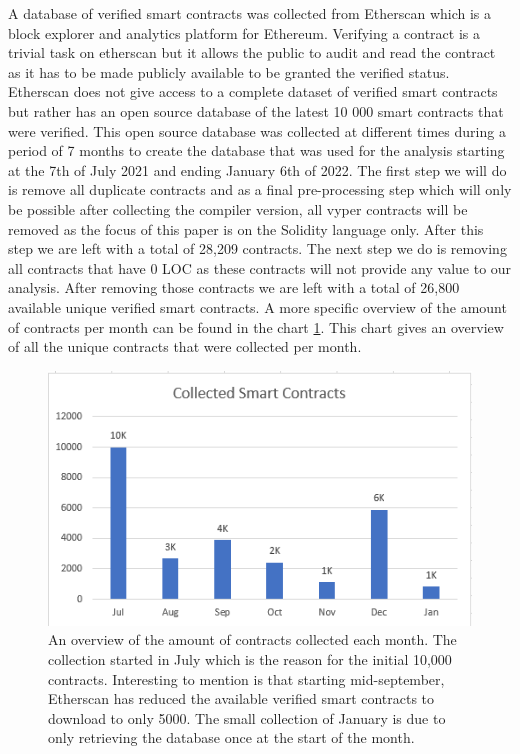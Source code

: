\documentclass[10pt,conference]{IEEEtran}
\begin{document}
A database of verified smart contracts was collected from Etherscan which is a block explorer and analytics platform for Ethereum. Verifying a contract is a trivial task on etherscan but it allows the public to audit and read the contract as it has to be made publicly available to be granted the verified status. Etherscan does not give access to a complete dataset of verified smart contracts but rather has an open source database of the latest 10 000 smart contracts that were verified. This open source database was collected at different times during a period of 7 months to create the database that was used for the analysis starting at the 7th of July 2021 and ending January 6th of 2022. The first step we will do is remove all duplicate contracts and as a final pre-processing step which will only be possible after collecting the compiler version, all vyper contracts will be removed as the focus of this paper is on the Solidity language only. After this step we are left with a total of 28,209 contracts. The next step we do is removing all contracts that have 0 LOC as these contracts will not provide any value to our analysis. After removing those contracts we are left with a total of 26,800 available unique verified smart contracts.
A more specific overview of the amount of contracts per month can be found in the chart \ref{fig:database}. This chart gives an overview of all the unique contracts that were collected per month.
\begin{figure}[h]
  \centering
  \includegraphics[width=\linewidth]{img/collected_contracts.PNG}
  \caption{An overview of the amount of contracts collected each month. The collection started in July which is the reason for the initial 10,000 contracts. Interesting to mention is that starting mid-september, Etherscan has reduced the available verified smart contracts to download to only 5000. The small collection of January is due to only retrieving the database once at the start of the month.}
  \label{fig:database}
\end{figure}
\end{document}
